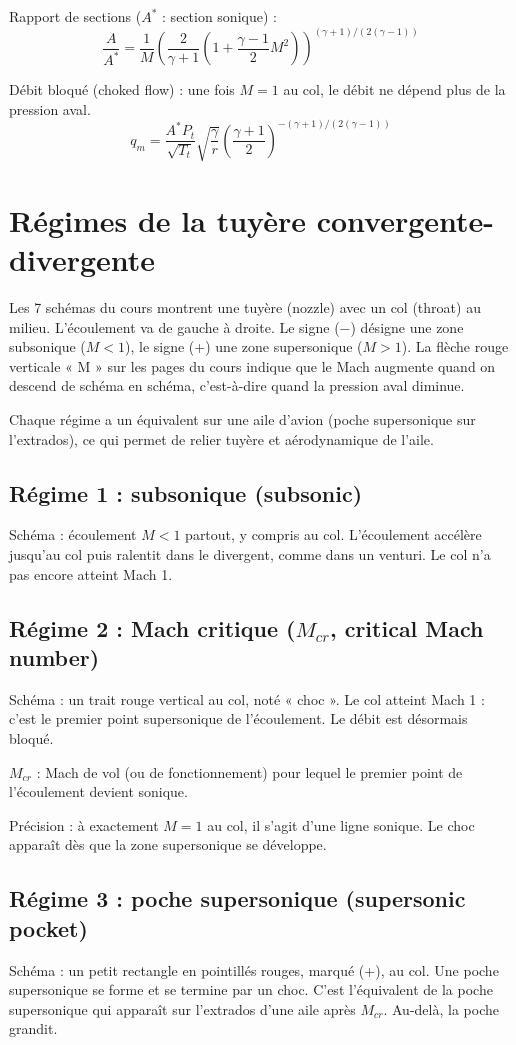 \documentclass{article}
\begin{document}
Rapport de sections ($A^*$ : section sonique) :
\[ \frac{A}{A^*} = \frac{1}{M} \left( \frac{2}{\gamma + 1} \left(1 + \frac{\gamma - 1}{2} M^2\right) \right)^{(\gamma + 1)/(2(\gamma - 1))} \]

Débit bloqué (choked flow) : une fois $M = 1$ au col, le débit ne dépend plus de la pression aval.
\[ q_m = \frac{A^* P_t}{\sqrt{T_t}} \sqrt{\frac{\gamma}{r}} \left(\frac{\gamma + 1}{2}\right)^{-(\gamma + 1)/(2(\gamma - 1))} \]

\section{Régimes de la tuyère convergente-divergente}

Les 7 schémas du cours montrent une tuyère (nozzle) avec un col (throat) au milieu. L'écoulement va de gauche à droite. Le signe (−) désigne une zone subsonique ($M < 1$), le signe (+) une zone supersonique ($M > 1$). La flèche rouge verticale « M » sur les pages du cours indique que le Mach augmente quand on descend de schéma en schéma, c'est-à-dire quand la pression aval diminue.

Chaque régime a un équivalent sur une aile d'avion (poche supersonique sur l'extrados), ce qui permet de relier tuyère et aérodynamique de l'aile.

\subsection{Régime 1 : subsonique (subsonic)}
Schéma : écoulement $M < 1$ partout, y compris au col. L'écoulement accélère jusqu'au col puis ralentit dans le divergent, comme dans un venturi. Le col n'a pas encore atteint Mach 1.

\subsection{Régime 2 : Mach critique ($M_{cr}$, critical Mach number)}
Schéma : un trait rouge vertical au col, noté « choc ». Le col atteint Mach 1 : c'est le premier point supersonique de l'écoulement. Le débit est désormais bloqué.

$M_{cr}$ : Mach de vol (ou de fonctionnement) pour lequel le premier point de l'écoulement devient sonique.

Précision : à exactement $M = 1$ au col, il s'agit d'une ligne sonique. Le choc apparaît dès que la zone supersonique se développe.

\subsection{Régime 3 : poche supersonique (supersonic pocket)}
Schéma : un petit rectangle en pointillés rouges, marqué (+), au col. Une poche supersonique se forme et se termine par un choc. C'est l'équivalent de la poche supersonique qui apparaît sur l'extrados d'une aile après $M_{cr}$. Au-delà, la poche grandit.
\end{document}
